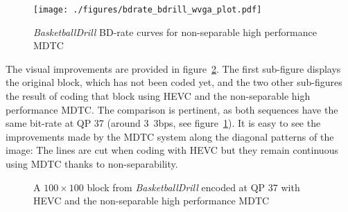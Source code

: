 \documentclass[11pt,a4paper,openright,twoside]{book}
\numberwithin{equation}{section} %
\numberwithin{figure}{section} %
\numberwithin{table}{section} %
\begin{document}
\begin{figure}[tb]
	\centering
	\texttt{[image: ./figures/bdrate\_bdrill\_wvga\_plot.pdf]}
	\caption{\emph{BasketballDrill} \acs{BD}-rate curves for non-separable
	high performance \acs{MDTC}}
	\label{fig:mdtc_bdrate_bdrill}
\end{figure}

The visual improvements are provided in figure~\ref{fig:mdtc_bdrill_visual}.
The first sub-figure displays the original block, which has not been coded
yet, and the two other sub-figures the result of coding that block using
\ac{HEVC} and the non-separable high performance \ac{MDTC}.
The comparison is pertinent, as both sequences have the same bit-rate at
\ac{QP} 37 (around \unit{3.3}{\mega bps}, see
figure~\ref{fig:mdtc_bdrate_bdrill}).
It is easy to see the improvements made by the \ac{MDTC} system along the
diagonal patterns of the image:
The lines are cut when coding with \ac{HEVC} but they remain continuous using
\ac{MDTC} thanks to non-separability.

\begin{figure}[tb]
	\centering
	\hfill
	\hfill
	\caption{A $100\times100$ block from \emph{BasketballDrill} encoded at
	\acs{QP} 37 with \acs{HEVC} and the non-separable high performance
	\acs{MDTC}}
	\label{fig:mdtc_bdrill_visual}
\end{figure}
\end{document}
